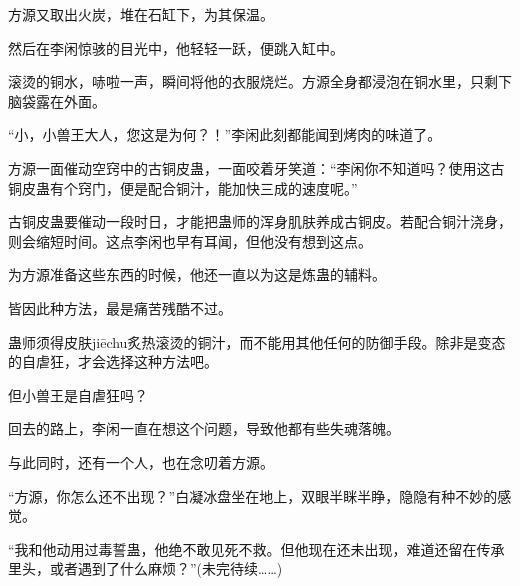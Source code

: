 \begin{this_body}
方源又取出火炭，堆在石缸下，为其保温。

然后在李闲惊骇的目光中，他轻轻一跃，便跳入缸中。

滚烫的铜水，哧啦一声，瞬间将他的衣服烧烂。方源全身都浸泡在铜水里，只剩下脑袋露在外面。

“小，小兽王大人，您这是为何？！”李闲此刻都能闻到烤肉的味道了。

方源一面催动空窍中的古铜皮蛊，一面咬着牙笑道：“李闲你不知道吗？使用这古铜皮蛊有个窍门，便是配合铜汁，能加快三成的速度呢。”

古铜皮蛊要催动一段时日，才能把蛊师的浑身肌肤养成古铜皮。若配合铜汁浇身，则会缩短时间。这点李闲也早有耳闻，但他没有想到这点。

为方源准备这些东西的时候，他还一直以为这是炼蛊的辅料。

皆因此种方法，最是痛苦残酷不过。

蛊师须得皮肤jiēchu炙热滚烫的铜汁，而不能用其他任何的防御手段。除非是变态的自虐狂，才会选择这种方法吧。

但小兽王是自虐狂吗？

回去的路上，李闲一直在想这个问题，导致他都有些失魂落魄。

与此同时，还有一个人，也在念叨着方源。

“方源，你怎么还不出现？”白凝冰盘坐在地上，双眼半眯半睁，隐隐有种不妙的感觉。

“我和他动用过毒誓蛊，他绝不敢见死不救。但他现在还未出现，难道还留在传承里头，或者遇到了什么麻烦？”(未完待续……)

\end{this_body}

